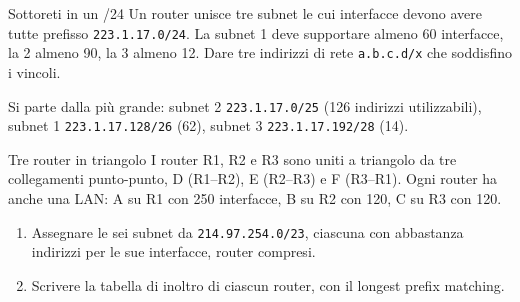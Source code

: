 \begin{esercizio}{Sottoreti in un /24}
Un router unisce tre subnet le cui interfacce devono avere tutte prefisso \texttt{223.1.17.0/24}. La subnet 1 deve supportare almeno 60
interfacce, la 2 almeno 90, la 3 almeno 12. Dare tre indirizzi di rete \texttt{a.b.c.d/x} che soddisfino i vincoli.

\svolgimento
Si parte dalla più grande: subnet 2 \texttt{223.1.17.0/25} (126 indirizzi utilizzabili), subnet 1 \texttt{223.1.17.128/26} (62),
subnet 3 \texttt{223.1.17.192/28} (14).
\end{esercizio}

\begin{esercizio}{Tre router in triangolo}
I router R1, R2 e R3 sono uniti a triangolo da tre collegamenti punto-punto, D (R1--R2), E (R2--R3) e F (R3--R1). Ogni router ha anche una
LAN: A su R1 con 250 interfacce, B su R2 con 120, C su R3 con 120.
\begin{enumerate}[label=(\alph*)]
    \item Assegnare le sei subnet da \texttt{214.97.254.0/23}, ciascuna con abbastanza indirizzi per le sue interfacce, router compresi.
    \item Scrivere la tabella di inoltro di ciascun router, con il longest prefix matching.
\end{enumerate}


\end{esercizio}

